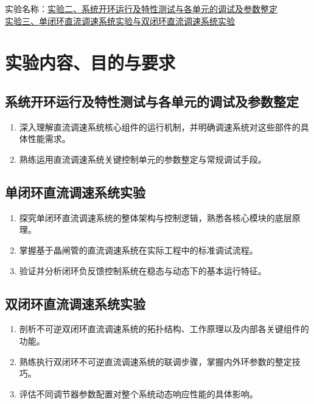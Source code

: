 	\vspace{0.5em}
	
	\begin{framed} 
		{\songti{}
			
			\begin{center}
				{\heiti{}
					{实验名称：\underline
						{实验二、系统开环运行及特性测试与各单元的调试及参数整定}\\\underline{实验三、单闭环直流调速系统实验与双闭环直流调速系统实验}}
				}
			\end{center}
			
			\section{实验内容、目的与要求}
			\subsection{系统开环运行及特性测试与各单元的调试及参数整定}
			\begin{enumerate}
				\item 深入理解直流调速系统核心组件的运行机制，并明确调速系统对这些部件的具体性能需求。
				\item 熟练运用直流调速系统关键控制单元的参数整定与常规调试手段。
			\end{enumerate}
			
			\subsection{单闭环直流调速系统实验}
			\begin{enumerate}
				\item 探究单闭环直流调速系统的整体架构与控制逻辑，熟悉各核心模块的底层原理。
				\item 掌握基于晶闸管的直流调速系统在实际工程中的标准调试流程。
				\item 验证并分析闭环负反馈控制系统在稳态与动态下的基本运行特征。
			\end{enumerate}
			
			\subsection{双闭环直流调速系统实验}
			\begin{enumerate}
				\item 剖析不可逆双闭环直流调速系统的拓扑结构、工作原理以及内部各关键组件的功能。
				\item 熟练执行双闭环不可逆直流调速系统的联调步骤，掌握内外环参数的整定技巧。
				\item 评估不同调节器参数配置对整个系统动态响应性能的具体影响。
			\end{enumerate}
			
}
\end{framed}
